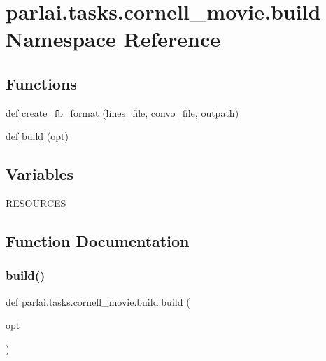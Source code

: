 \hypertarget{namespaceparlai_1_1tasks_1_1cornell__movie_1_1build}{}\section{parlai.\+tasks.\+cornell\+\_\+movie.\+build Namespace Reference}
\label{namespaceparlai_1_1tasks_1_1cornell__movie_1_1build}
\subsection*{Functions}
\begin{DoxyCompactItemize}
\item 
def \hyperlink{namespaceparlai_1_1tasks_1_1cornell__movie_1_1build_ad02efe0879bce0da293ba177112e1af3}{create\+\_\+fb\+\_\+format} (lines\+\_\+file, convo\+\_\+file, outpath)
\item 
def \hyperlink{namespaceparlai_1_1tasks_1_1cornell__movie_1_1build_aced5c0daa1d9fa613eb87535e22f1b47}{build} (opt)
\end{DoxyCompactItemize}
\subsection*{Variables}
\begin{DoxyCompactItemize}
\item 
\hyperlink{namespaceparlai_1_1tasks_1_1cornell__movie_1_1build_ac28041130f45c27ff10168f8046b65e9}{R\+E\+S\+O\+U\+R\+C\+ES}
\end{DoxyCompactItemize}


\subsection{Function Documentation}
\mbox{\label{namespaceparlai_1_1tasks_1_1cornell__movie_1_1build_aced5c0daa1d9fa613eb87535e22f1b47}} 
\subsubsection{\texorpdfstring{build()}{build()}}
{\footnotesize\ttfamily def parlai.\+tasks.\+cornell\+\_\+movie.\+build.\+build (\begin{DoxyParamCaption}\item[{}]{opt }\end{DoxyParamCaption})}



